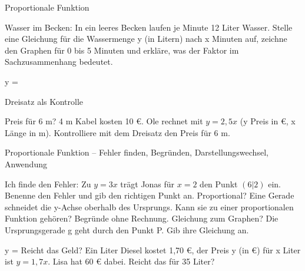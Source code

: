 \begin{aufgabe}{Proportionale Funktion}
\begin{teile}
\teil Wasser im Becken: In ein leeres Becken laufen je Minute 12 Liter Wasser. Stelle eine Gleichung für die Wassermenge y (in Litern) nach x Minuten auf, zeichne den Graphen für 0 bis 5 Minuten und erkläre, was der Faktor im Sachzusammenhang bedeutet.

\begin{ksys}[xmin=0,xmax=6,ymin=0,ymax=80,xstep=1,ystep=10,xlabel=x in min,ylabel=y in l] \end{ksys}
y = \leerfeld
\end{teile}
\end{aufgabe}

\begin{aufgabe}{Dreisatz als Kontrolle}
\begin{teile}
\teil Preis für 6 m? 4 m Kabel kosten 10 €. Ole rechnet mit $y = 2{,}5x$ (y Preis in €, x Länge in m). Kontrolliere mit dem Dreisatz den Preis für 6 m. \leerfeld[€]
\end{teile}
\end{aufgabe}

\begin{aufgabe}{Proportionale Funktion – Fehler finden, Begründen, Darstellungswechsel, Anwendung}
\begin{teile}
\teil Ich finde den Fehler: Zu $y = 3x$ trägt Jonas für $x = 2$ den Punkt $(6|2)$ ein. Benenne den Fehler und gib den richtigen Punkt an.
\teil Proportional? Eine Gerade schneidet die y-Achse oberhalb des Ursprungs. Kann sie zu einer proportionalen Funktion gehören? Begründe ohne Rechnung.
\teil Gleichung zum Graphen? Die Ursprungsgerade g geht durch den Punkt P. Gib ihre Gleichung an.

\begin{ksys}[xmin=-1,xmax=5,ymin=-1,ymax=7,ablesen]   \end{ksys}
y = \leerfeld
\teil Reicht das Geld? Ein Liter Diesel kostet 1{,}70 €, der Preis y (in €) für x Liter ist $y = 1{,}7x$. Lisa hat 60 € dabei. Reicht das für 35 Liter? \janein
\end{teile}
\end{aufgabe}
